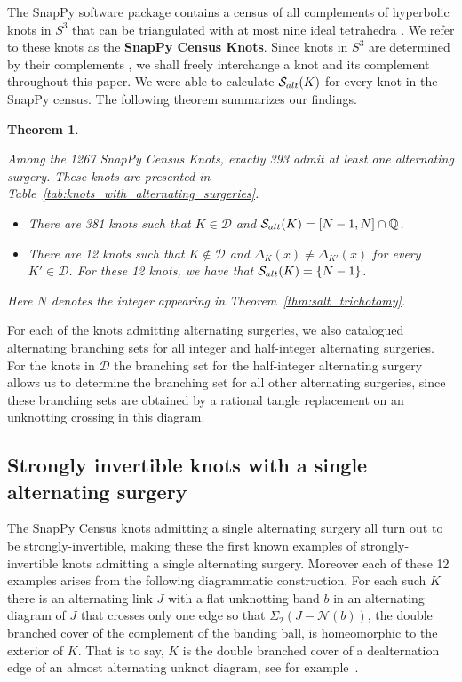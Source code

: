 \documentclass{amsart} %
\newcommand{\D}{\mathcal{D}}
\newcommand{\Q}{\mathbb{Q}}
\newcommand{\Salt}{\mathcal{S}_{\rm alt}}
\newcommand{\nbhd}{\mathcal{N}}
\theoremstyle{thm}
\newtheorem{thm}[Theorem]{Theorem}
\theoremstyle{definition}
\numberwithin{equation}{section}
\begin{document}
The SnapPy software package contains a census of all complements of hyperbolic knots in $S^3$ that can be triangulated with at most nine ideal tetrahedra \cite{CDGW}.  We refer to these knots as the \textbf{SnapPy Census Knots}. Since knots in $S^3$ are determined by their complements \cite{GL89}, we shall freely interchange a knot and its complement throughout this paper. 
We were able to calculate $\Salt(K)$ for every knot in the SnapPy census. The following theorem summarizes our findings.

\newcommand{\altsurgeryclassification}{
Among the 1267 SnapPy Census Knots, exactly 393 admit at least one alternating surgery. These knots are presented in Table~\ref{tab:knots_with_alternating_surgeries}.
\begin{itemize}
    \item There are 381 knots such that $K\in\D$ and $\Salt(K)=[N-1,N] \cap \Q$.
    \item There are 12 knots such that $K\notin \D$ and $\Delta_K(x)\neq \Delta_{K'}(x)$ for every $K'\in \D$. For these 12 knots, we have that $\Salt(K)=\{N-1\}$.
\end{itemize}
Here $N$ denotes the integer appearing in Theorem~\ref{thm:salt_trichotomy}.
}

\begin{thm}
\label{thm:altsurgclassification} 
\altsurgeryclassification
\end{thm}
For each of the knots admitting alternating surgeries, we also catalogued alternating branching sets for all integer and half-integer alternating surgeries. For the knots in $\D$ the branching set for the half-integer alternating surgery allows us to determine the branching set for all other alternating surgeries, since these branching sets are obtained by a rational tangle replacement on an unknotting crossing in this diagram. 

\subsection{Strongly invertible knots with a single alternating surgery}

The Snap\-Py Census knots admitting a single alternating surgery all turn out to be strongly-invertible, making these the first known examples of strongly-invertible knots admitting a single alternating surgery. Moreover each of these 12 examples arises from the following diagrammatic construction. For each such $K$ there is an alternating link $J$ with a flat unknotting band $b$ in an alternating diagram of $J$ that crosses only one edge so that $\Sigma_2(J-\nbhd(b))$, the double branched cover of the complement of the banding ball, is homeomorphic to the exterior of $K$. 
That is to say, $K$ is the double branched cover of a dealternation edge of an almost alternating unknot diagram, see for example~\cite[Figure 28]{BL17}.   
\end{document}
